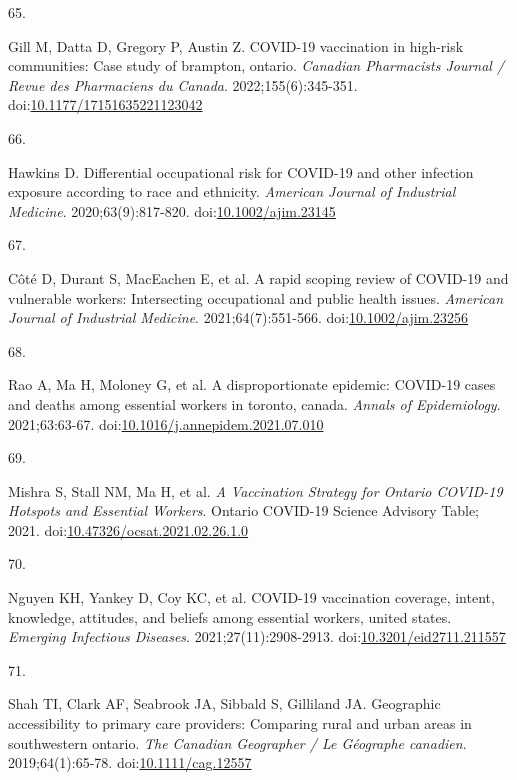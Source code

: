 \documentclass[
]{article}
\newlength{\cslhangindent}
\newlength{\csllabelwidth}
\newlength{\cslentryspacingunit} %
\newenvironment{CSLReferences}[2] %
 {%
  \setlength{\parindent}{0pt}
  \ifodd #1
  \let\oldpar\par
  \def\par{\hangindent=\cslhangindent\oldpar}
  \fi
  \setlength{\parskip}{#2\cslentryspacingunit}
 }%
 {}
\newcommand{\CSLLeftMargin}[1]{\parbox[t]{\csllabelwidth}{#1}}
\newcommand{\CSLRightInline}[1]{\parbox[t]{\linewidth - \csllabelwidth}{#1}\break}
\begin{document}
\begin{CSLReferences}{0}{0}
\leavevmode{}%
\CSLLeftMargin{65. }%
\CSLRightInline{Gill M, Datta D, Gregory P, Austin Z. {COVID}-19
vaccination in high-risk communities: Case study of brampton, ontario.
\emph{Canadian Pharmacists Journal / Revue des Pharmaciens du Canada}.
2022;155(6):345-351.
doi:\href{https://doi.org/10.1177/17151635221123042}{10.1177/17151635221123042}}

\leavevmode{}%
\CSLLeftMargin{66. }%
\CSLRightInline{Hawkins D. Differential occupational risk for {COVID}-19
and other infection exposure according to race and ethnicity.
\emph{American Journal of Industrial Medicine}. 2020;63(9):817-820.
doi:\href{https://doi.org/10.1002/ajim.23145}{10.1002/ajim.23145}}

\leavevmode{}%
\CSLLeftMargin{67. }%
\CSLRightInline{Côté D, Durant S, MacEachen E, et al. A rapid scoping
review of {COVID}-19 and vulnerable workers: Intersecting occupational
and public health issues. \emph{American Journal of Industrial
Medicine}. 2021;64(7):551-566.
doi:\href{https://doi.org/10.1002/ajim.23256}{10.1002/ajim.23256}}

\leavevmode{}%
\CSLLeftMargin{68. }%
\CSLRightInline{Rao A, Ma H, Moloney G, et al. A disproportionate
epidemic: {COVID}-19 cases and deaths among essential workers in
toronto, canada. \emph{Annals of Epidemiology}. 2021;63:63-67.
doi:\href{https://doi.org/10.1016/j.annepidem.2021.07.010}{10.1016/j.annepidem.2021.07.010}}

\leavevmode{}%
\CSLLeftMargin{69. }%
\CSLRightInline{Mishra S, Stall NM, Ma H, et al. \emph{A Vaccination
Strategy for Ontario {COVID}-19 Hotspots and Essential Workers}. Ontario
{COVID}-19 Science Advisory Table; 2021.
doi:\href{https://doi.org/10.47326/ocsat.2021.02.26.1.0}{10.47326/ocsat.2021.02.26.1.0}}

\leavevmode{}%
\CSLLeftMargin{70. }%
\CSLRightInline{Nguyen KH, Yankey D, Coy KC, et al. {COVID}-19
vaccination coverage, intent, knowledge, attitudes, and beliefs among
essential workers, united states. \emph{Emerging Infectious Diseases}.
2021;27(11):2908-2913.
doi:\href{https://doi.org/10.3201/eid2711.211557}{10.3201/eid2711.211557}}

\leavevmode{}%
\CSLLeftMargin{71. }%
\CSLRightInline{Shah TI, Clark AF, Seabrook JA, Sibbald S, Gilliland JA.
Geographic accessibility to primary care providers: Comparing rural and
urban areas in southwestern ontario. \emph{The Canadian Geographer / Le
G{é}ographe canadien}. 2019;64(1):65-78.
doi:\href{https://doi.org/10.1111/cag.12557}{10.1111/cag.12557}}


\end{CSLReferences}
\end{document}
